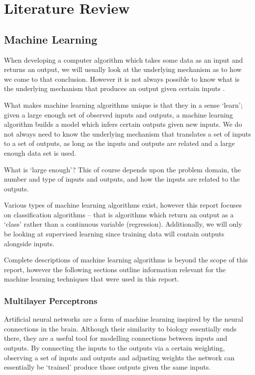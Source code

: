 \chapter{Literature Review}
\label{background}
\section{Machine Learning} \label{background_machinelearning}
When developing a computer algorithm which takes some data as an input and returns an output,
we will usually look at the underlying mechanism as to how we come to that conclusion. However it is not
always possible to know what is the underlying mechanism that produces an output
given certain inputs \cite{intro_to_machine_learning_2010}.

What makes machine learning algorithms unique is that they in a sense `learn'; given a large
enough set of observed inputs and outputs, a machine learning algorithm builds a model which infers
certain outputs given new inputs. We do not always need to know the underlying mechanism that
translates a set of inputs to a set of outputs, as long as the inputs and outputs are related and
a large enough data set is used.

What is `large enough'? This of course depends upon the problem domain, the number and type of inputs and outputs,
and how the inputs are related to the outputs. 

Various types of machine learning algorithms exist, however this report focuses on classification
algorithms -- that is algorithms which return an output as a `class' rather than a continuous variable
(regression). Additionally, we will only be looking at supervised learning since training data will contain
outputs alongside inputs.

Complete descriptions of machine learning algorithms is beyond the scope of this report, however
the following sections outline information relevant for the machine learning techniques
that were used in this report.

\subsection{Multilayer Perceptrons}
Artificial neural networks are a form of machine learning inspired by the neural connections
in the brain. Although their similarity to biology essentially ends there, they are a useful
tool for modelling connections between inputs and outputs. By connecting the inputs to the
outputs via a certain weighting, observing a set of inputs and outputs and adjusting weights
the network can essentially be `trained' produce those outputs given the same inputs.

